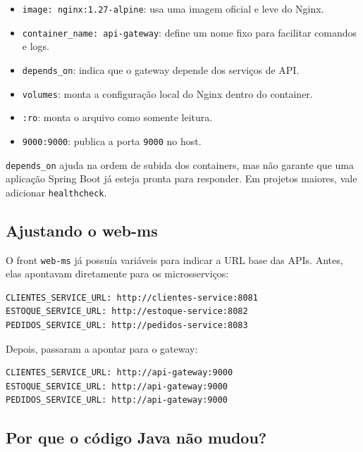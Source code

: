 \documentclass[12pt,a4paper]{article}
\begin{document}
\begin{itemize}[leftmargin=1.5em]
  \item \texttt{image: nginx:1.27-alpine}: usa uma imagem oficial e leve do Nginx.
  \item \texttt{container\_name: api-gateway}: define um nome fixo para facilitar comandos e logs.
  \item \texttt{depends\_on}: indica que o gateway depende dos servi\c{c}os de API.
  \item \texttt{volumes}: monta a configura\c{c}\~ao local do Nginx dentro do container.
  \item \texttt{:ro}: monta o arquivo como somente leitura.
  \item \texttt{9000:9000}: publica a porta \texttt{9000} no host.
\end{itemize}

\begin{alertbox}
  \texttt{depends\_on} ajuda na ordem de subida dos containers, mas n\~ao garante que uma aplica\c{c}\~ao Spring Boot j\'a esteja pronta para responder. Em projetos maiores, vale adicionar \texttt{healthcheck}.
\end{alertbox}

\subsection{Ajustando o web-ms}

O front \texttt{web-ms} j\'a possu\'ia vari\'aveis para indicar a URL base das APIs. Antes, elas apontavam diretamente para os microsservi\c{c}os:

\begin{lstlisting}[style=code]
CLIENTES_SERVICE_URL: http://clientes-service:8081
ESTOQUE_SERVICE_URL: http://estoque-service:8082
PEDIDOS_SERVICE_URL: http://pedidos-service:8083
\end{lstlisting}

Depois, passaram a apontar para o gateway:

\begin{lstlisting}[style=code]
CLIENTES_SERVICE_URL: http://api-gateway:9000
ESTOQUE_SERVICE_URL: http://api-gateway:9000
PEDIDOS_SERVICE_URL: http://api-gateway:9000
\end{lstlisting}

\subsection{Por que o c\'odigo Java n\~ao mudou?}
\end{document}
